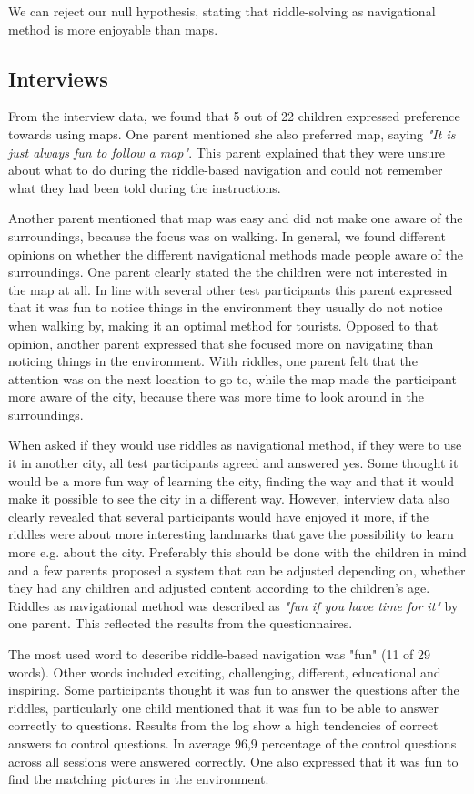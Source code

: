 We can reject our null hypothesis, stating that riddle-solving as navigational method is more enjoyable than maps.

\subsection{Interviews}
From the interview data, we found that 5 out of 22 children expressed preference towards using maps. One parent mentioned she also preferred map, saying \textit{"It is just always fun to follow a map"}. This parent explained that they were unsure about what to do during the riddle-based navigation and could not remember what they had been told during the instructions. 

Another parent mentioned that map was easy and did not make one aware of the surroundings, because the focus was on walking. In general, we found different opinions on whether the different navigational methods made people aware of the surroundings. One parent clearly stated the the children were not interested in the map at all. In line with several other test participants this parent expressed that it was fun to notice things in the environment they usually do not notice when walking by, making it an optimal method for tourists. Opposed to that opinion, another parent expressed that she focused more on navigating than noticing things in the environment. With riddles, one parent felt that the attention was on the next location to go to, while the map made the participant more aware of the city, because there was more time to look around in the surroundings. 

When asked if they would use riddles as navigational method, if they were to use it in another city, all test participants agreed and answered yes. Some thought it would be a more fun way of learning the city, finding the way and that it would make it possible to see the city in a different way. However, interview data also clearly revealed that several participants would have enjoyed it more, if the riddles were about more interesting landmarks that gave the possibility to learn more e.g. about the city. Preferably this should be done with the children in mind and a few parents proposed a system that can be adjusted depending on, whether they had any children and adjusted content according to the children’s age. Riddles as navigational method was described as \textit{"fun if you have time for it"} by one parent. This reflected the results from the questionnaires. 

The most used word to describe riddle-based navigation was "fun" (11 of 29 words). Other words included exciting, challenging, different, educational and inspiring. Some participants thought it was fun to answer the questions after the riddles, particularly one child mentioned that it was fun to be able to answer correctly to questions. Results from the log show a high tendencies of correct answers to control questions. In average 96,9 percentage of the control questions across all sessions were answered correctly. One also expressed that it was fun to find the matching pictures in the environment. 

